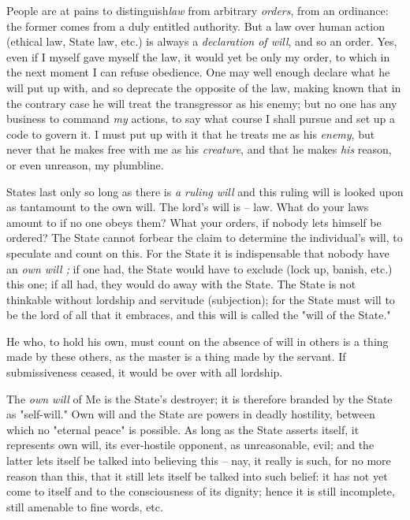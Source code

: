 \documentclass[a4paper]{book}
\begin{document}
People are at pains to distinguish\textit{law} from arbitrary \textit{orders}, 
from an ordinance: the former comes from a duly entitled authority. But a law 
over human action (ethical law, State law, etc.) is always a 
\textit{declaration of will}, and so an order. Yes, even if I myself gave 
myself the law, it would yet be only my order, to which in the next moment I 
can refuse obedience. One may well enough declare what he will put up with, 
and so deprecate the opposite of the law, making known that in the contrary 
case he will treat the transgressor as his enemy; but no one has any business 
to command \textit{my} actions, to say what course I shall pursue and set up a 
code to govern it. I must put up with it that he treats me as his 
\textit{enemy}, but never that he makes free with me as his \textit{creature}, 
and that he makes \textit{his} reason, or even unreason, my plumbline.

States last only so long as there is \textit{a ruling will} and this ruling 
will is looked upon as tantamount to the own will. The lord's will is -- law. 
What do your laws amount to if no one obeys them? What your orders, if nobody 
lets himself be ordered? The State cannot forbear the claim to determine the 
individual's will, to speculate and count on this. For the State it is 
indispensable that nobody have an \textit{own will ;} if one had, the State 
would have to exclude (lock up, banish, etc.) this one; if all had, they would 
do away with the State. The State is not thinkable without lordship and 
servitude (subjection); for the State must will to be the lord of all that it 
embraces, and this will is called the "{}will of the State."{}

He who, to hold his own, must count on the absence of will in others is a 
thing made by these others, as the master is a thing made by the servant. If 
submissiveness ceased, it would be over with all lordship.

The \textit{own will} of Me is the State's destroyer; it is therefore branded 
by the State as "{}self-will."{} Own will and the State are powers in deadly 
hostility, between which no "{}eternal peace"{} is possible. As long as the 
State asserts itself, it represents own will, its ever-hostile opponent, as 
unreasonable, evil; and the latter lets itself be talked into believing this 
-- nay, it really is such, for no more reason than this, that it still lets 
itself be talked into such belief: it has not yet come to itself and to the 
consciousness of its dignity; hence it is still incomplete, still amenable to 
fine words, etc.
\end{document}

